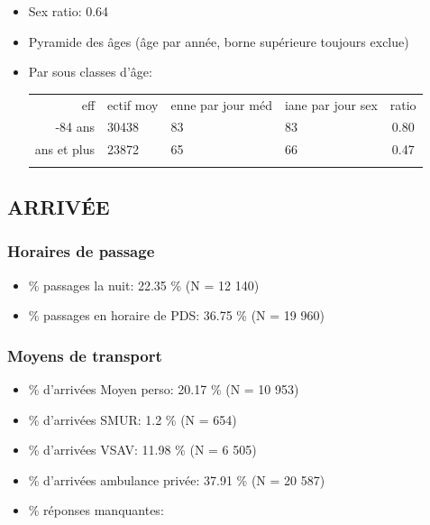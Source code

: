 \documentclass[]{article}
\begin{document}
\begin{itemize}
\item
  Sex ratio: 0.64
\item
  Pyramide des âges (âge par année, borne supérieure toujours exclue)
\item
  Par sous classes d'âge:

  \begin{longtable}[c]{@{}rlllc@{}}
  \toprule\addlinespace
  eff & ectif moy & enne par jour méd & iane par jour sex & ratio
  \\\addlinespace
  \midrule\endhead
  75-84 ans & 30438 & 83 & 83 & 0.80
  \\\addlinespace
  85 ans et plus & 23872 & 65 & 66 & 0.47
  \\\addlinespace
  \bottomrule
  \end{longtable}
\end{itemize}

\subsection{ARRIVÉE}\label{arrivee-1}

\subsubsection{Horaires de passage}\label{horaires-de-passage-1}

\begin{itemize}
\itemsep1pt\parskip0pt
\item
  \% passages la nuit: 22.35 \% (N = 12 140)
\item
  \% passages en horaire de PDS: 36.75 \% (N = 19 960)
\end{itemize}

\subsubsection{Moyens de transport}\label{moyens-de-transport}

\begin{itemize}
\itemsep1pt\parskip0pt
\item
  \% d'arrivées Moyen perso: 20.17 \% (N = 10 953)
\item
  \% d'arrivées SMUR: 1.2 \% (N = 654)
\item
  \% d'arrivées VSAV: 11.98 \% (N = 6 505)
\item
  \% d'arrivées ambulance privée: 37.91 \% (N = 20 587)
\item
  \% réponses manquantes:
\end{itemize}
\end{document}
